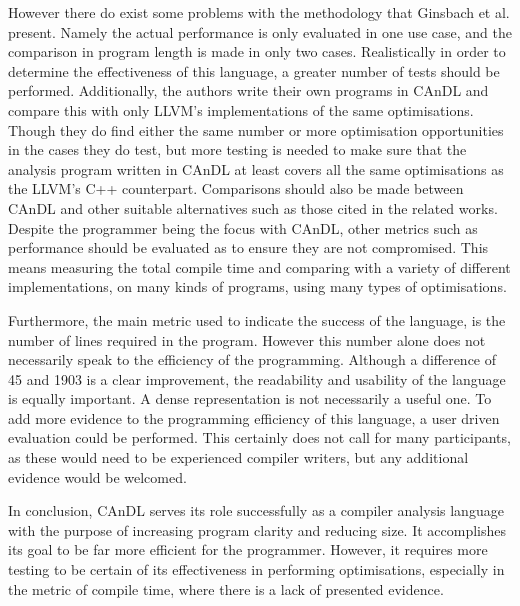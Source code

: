 \documentclass[12pt]{article}
\begin{document}
However there do exist some problems with the methodology that Ginsbach et al. present. Namely the actual performance is only evaluated in one use case, and the comparison in program length is made in only two cases. Realistically in order to determine the effectiveness of this language, a greater number of tests should be performed. Additionally, the authors write their own programs in CAnDL and compare this with only LLVM's implementations of the same optimisations. Though they do find either the same number or more optimisation opportunities in the cases they do test, but more testing is needed to make sure that the analysis program written in CAnDL at least covers all the same optimisations as the LLVM's C++ counterpart. Comparisons should also be made between CAnDL and other suitable alternatives such as those cited in the related works. Despite the programmer being the focus with CAnDL, other metrics such as performance should be evaluated as to ensure they are not compromised. This means measuring the total compile time and comparing with a variety of different implementations, on many kinds of programs, using many types of optimisations. 

Furthermore, the main metric used to indicate the success of the language, is the number of lines required in the program. However this number alone does not necessarily speak to the efficiency of the programming. Although a difference of 45 and 1903 is a clear improvement, the readability and usability of the language is equally important. A dense representation is not necessarily a useful one. To add more evidence to the programming efficiency of this language, a user driven evaluation could be performed. This certainly does not call for many participants, as these would need to be experienced compiler writers, but any additional evidence would be welcomed. 

In conclusion, CAnDL serves its role successfully as a compiler analysis language with the purpose of increasing program clarity and reducing size. It accomplishes its goal to be far more efficient for the programmer. However, it requires more testing to be certain of its effectiveness in performing optimisations, especially in the metric of compile time, where there is a lack of presented evidence. 



\end{document}
